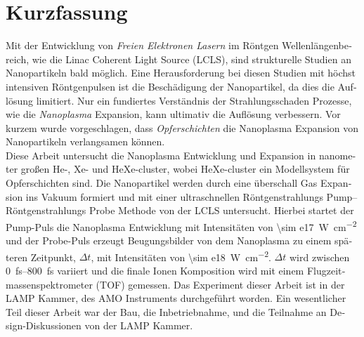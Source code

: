 \section*{Kurzfassung}
\begin{otherlanguage}{german}
Mit der Entwicklung von \textit{Freien Elektronen Lasern} im Röntgen Wellenlängenbereich, wie die Linac Coherent Light Source (LCLS), sind strukturelle Studien an Nanopartikeln bald möglich. Eine Herausforderung bei diesen Studien mit höchst intensiven Röntgenpulsen ist die Beschädigung der Nanopartikel, da dies die Auflösung limitiert. Nur ein fundiertes Verständnis der Strahlungsschaden Prozesse, wie die \textit{Nanoplasma} Expansion, kann ultimativ die Auflösung verbessern. Vor kurzem wurde vorgeschlagen, dass \textit{Opferschichten} die Nanoplasma Expansion von Nanopartikeln verlangsamen können.\\[0.4\baselineskip]
%
Diese Arbeit untersucht die Nanoplasma Entwicklung und Expansion in nanometer großen He-, Xe- und HeXe-cluster, wobei HeXe-cluster ein Modellsystem für Opferschichten sind. Die Nanopartikel werden durch eine überschall Gas Expansion ins Vakuum formiert und mit einer ultraschnellen Röntgenstrahlungs Pump--Röntgenstrahlungs Probe Methode von der LCLS untersucht. Hierbei startet der Pump-Puls die Nanoplasma Entwicklung mit Intensitäten von \SI{\sim e17}{\watt\per\square\centi\meter} und der Probe-Puls erzeugt Beugungsbilder von dem Nanoplasma zu einem späteren Zeitpunkt, $\Delta t$, mit Intensitäten von \SI{\sim e18}{\watt\per\square\centi\meter}. $\Delta t$ wird zwischen \SIrange{0}{800}{\femto\second} variiert und die finale Ionen Komposition wird mit einem Flugzeitmassenspektrometer (TOF) gemessen. Das Experiment dieser Arbeit ist in der LAMP Kammer, des AMO Instruments durchgeführt worden. Ein wesentlicher Teil dieser Arbeit war der Bau, die Inbetriebnahme, und die Teilnahme an Design-Diskussionen von der LAMP Kammer.\\[0.4\baselineskip]
%

\end{otherlanguage}
